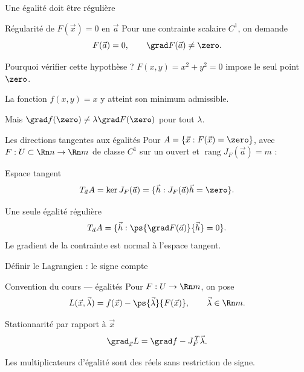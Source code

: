 \begin{frame}[t]{Une égalité doit être régulière}
\coursanalyse
\begin{notion}{Régularité de $F(\vec x)=0$ en $\vec a$}
Pour une contrainte scalaire $C^1$, on demande
\[F(\vec a)=0,\qquad\grad F(\vec a)\ne\zero.\]
\end{notion}
\begin{exemple}{Pourquoi vérifier cette hypothèse ?}
$F(x,y)=x^2+y^2=0$ impose le seul point $\zero$.
\par La fonction $f(x,y)=x$ y atteint son minimum admissible.
\par Mais $\grad f(\zero)\ne\lambda\grad F(\zero)$ pour tout $\lambda$.
\end{exemple}
\end{frame}

\begin{frame}[t]{Les directions tangentes aux égalités}
\coursanalyse
Pour $A=\{\vec x:F(\vec x)=\zero\}$, avec $F:U\subset\Rn n\to\Rn m$ de classe $C^1$ sur un ouvert et $\operatorname{rang}J_F(\vec a)=m$ :
\begin{notion}{Espace tangent}
\[T_{\vec a}A=\ker J_F(\vec a)=\{\vec h:J_F(\vec a)\vec h=\zero\}.\]
\end{notion}
\begin{resultat}{Une seule égalité régulière}
\[T_{\vec a}A=\{\vec h:\ps{\grad F(\vec a)}{\vec h}=0\}.\]
Le gradient de la contrainte est normal à l’espace tangent.
\end{resultat}
\end{frame}

\begin{frame}[t]{Définir le Lagrangien : le signe compte}
\coursanalyse
\begin{notion}{Convention du cours — égalités}
Pour $F:U\to\Rn m$, on pose
\[L(\vec x,\vec\lambda)=f(\vec x)-\ps{\vec\lambda}{F(\vec x)},\qquad\vec\lambda\in\Rn m.\]
\end{notion}
\begin{resultat}{Stationnarité par rapport à $\vec x$}
\[\grad_{\vec x}L=\grad f-J_F^{\,T}\vec\lambda.\]
\end{resultat}\vfill Les multiplicateurs d’égalité sont des réels sans restriction de signe.
\end{frame}

